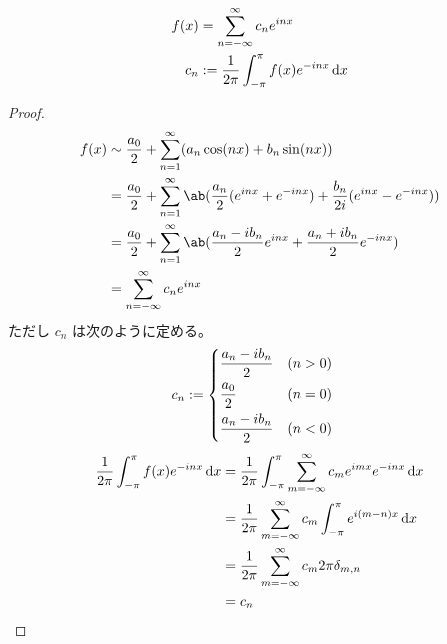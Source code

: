\documentclass[uplatex,dvipdfmx,a4paper,11pt]{jlreq}
\begin{document}
\begin{definition}[$2\pi$ の周期をもつ関数の複素フーリエ級数]
  \begin{align}
    f(x) & = \sum_{n=-\infty}^{\infty}c_ne^{inx}               \\
    c_n  & := \frac{1}{2\pi}\int_{-\pi}^\pi f(x)e^{-inx}\dl{x}
  \end{align}
\end{definition}
\begin{proof}
  \begin{align}
    f(x) & \sim \frac{a_0}{2} + \sum_{n=1}^{\infty}(a_n\cos(nx) + b_n\sin(nx))                                              \\
         & = \frac{a_0}{2} + \sum_{n=1}^{\infty}\ab(\frac{a_n}{2}(e^{inx} + e^{-inx}) + \frac{b_n}{2i}(e^{inx} - e^{-inx})) \\
         & = \frac{a_0}{2} + \sum_{n=1}^{\infty}\ab(\frac{a_n - ib_n}{2}e^{inx} + \frac{a_n + ib_n}{2}e^{-inx})             \\
         & = \sum_{n=-\infty}^{\infty}c_ne^{inx}
  \end{align}
  ただし $c_n$ は次のように定める。
  \begin{align}
    c_n & := \begin{dcases}
               \frac{a_n - ib_n}{2} & (n > 0) \\
               \frac{a_0}{2}        & (n = 0) \\
               \frac{a_n - ib_n}{2} & (n < 0)
             \end{dcases}
  \end{align}
  \begin{align}
    \frac{1}{2\pi}\int_{-\pi}^\pi f(x)e^{-inx}\dl{x} & = \frac{1}{2\pi}\int_{-\pi}^\pi\sum_{m=-\infty}^{\infty}c_me^{imx}e^{-inx}\dl{x} \\
                                                     & = \frac{1}{2\pi}\sum_{m=-\infty}^{\infty}c_m\int_{-\pi}^\pi e^{i(m - n)x}\dl{x}  \\
                                                     & = \frac{1}{2\pi}\sum_{m=-\infty}^{\infty}c_m 2\pi\delta_{m,n}                    \\
                                                     & = c_n
  \end{align}
\end{proof}
\end{document}
